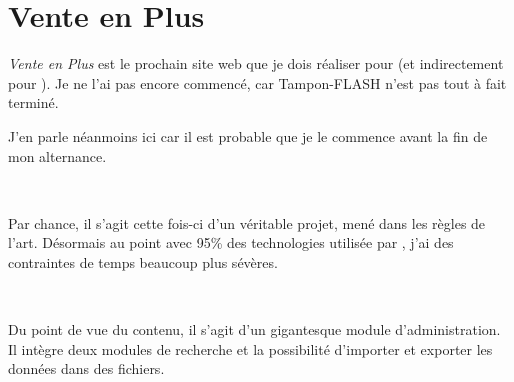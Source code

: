 \chapter{Vente en Plus}
\emph{Vente en Plus} est le prochain site web que je dois réaliser pour \fidit (et indirectement pour \solulog). Je ne l'ai pas encore commencé, car Tampon-FLASH n'est pas tout à fait terminé.

J'en parle néanmoins ici car il est probable que je le commence avant la fin de mon alternance.

~

Par chance, il s'agit cette fois-ci d'un véritable projet, mené dans les règles de l'art. Désormais au point avec 95\% des technologies utilisée par \fidit, j'ai des contraintes de temps beaucoup plus sévères.

~

Du point de vue du contenu, il s'agit d'un gigantesque module d'administration. Il intègre deux modules de recherche et la possibilité d'importer et exporter les données dans des fichiers.
